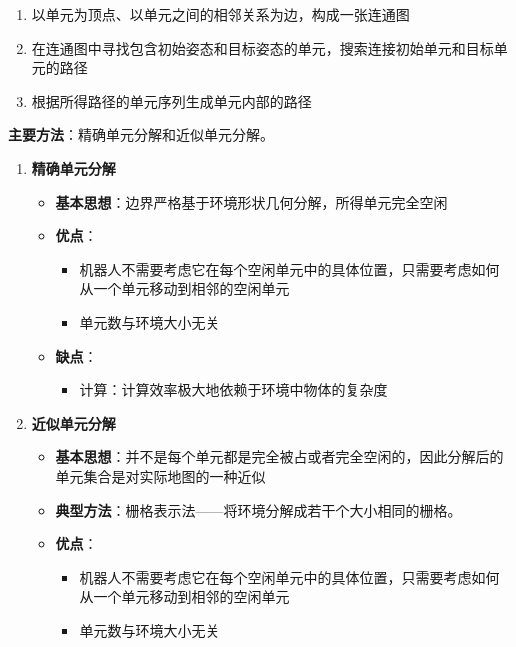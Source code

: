 \documentclass[../main.tex]{subfiles}
\begin{document}
\begin{enumerate}
\begin{enumerate}
            \item 以单元为顶点、以单元之间的相邻关系为边，构成一张连通图
            \item 在连通图中寻找包含初始姿态和目标姿态的单元，搜索连接初始单元和目标单元的路径
            \item 根据所得路径的单元序列生成单元内部的路径
        \end{enumerate}
      \textbf{主要方法}：精确单元分解和近似单元分解。
        \begin{enumerate}
            \item \textbf{精确单元分解}\label{item:res:cell:exact}
                \begin{itemize}
                    \item \textbf{基本思想}：边界严格基于环境形状几何分解，所得单元完全空闲
                    \item \textbf{优点}：
                        \begin{itemize}
                            \item 机器人不需要考虑它在每个空闲单元中的具体位置，只需要考虑如何从一个单元移动到相邻的空闲单元
                            \item 单元数与环境大小无关
                        \end{itemize}
                    \item \textbf{缺点}：
                        \begin{itemize}
                            \item 计算：计算效率极大地依赖于环境中物体的复杂度
                        \end{itemize}
                \end{itemize}            
            \item \textbf{近似单元分解}\label{item:res:cell:approx}
                \begin{itemize}
                    \item \textbf{基本思想}：并不是每个单元都是完全被占或者完全空闲的，因此分解后的单元集合是对实际地图的一种近似
                    \item \textbf{典型方法}：栅格表示法——将环境分解成若干个大小相同的栅格。
                    \item \textbf{优点}：
                        \begin{itemize}
                            \item 机器人不需要考虑它在每个空闲单元中的具体位置，只需要考虑如何从一个单元移动到相邻的空闲单元
                            \item 单元数与环境大小无关

\end{itemize}
\end{itemize}
\end{enumerate}
\end{enumerate}
\end{document}
